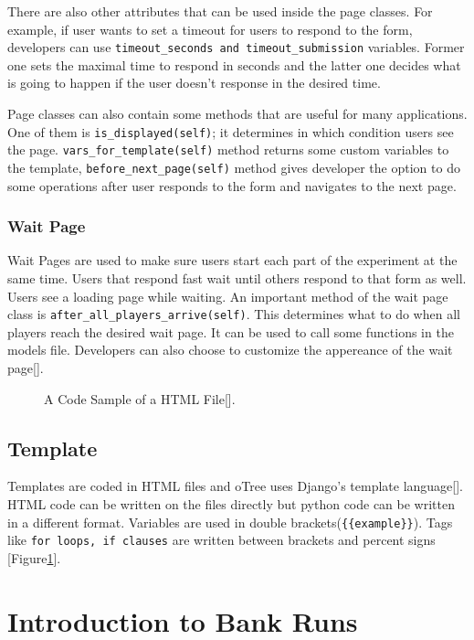 There are also other attributes that can be used inside the page classes. For example, if user wants to set a timeout for users to respond to the form, developers can use \verb|timeout_seconds and timeout_submission| variables. Former one sets the maximal time to respond in seconds and the latter one decides what is going to happen if the user doesn't response in the desired time.

Page classes can also contain some methods that are useful for many applications. One of them is \verb|is_displayed(self)|; it determines in which condition users see the page. \verb|vars_for_template(self)| method returns some custom variables to the template, \verb|before_next_page(self)| method gives developer the option to do some operations after user responds to the form and navigates to the next page.

\subsubsection{Wait Page}

Wait Pages are used to make sure users start each part of the experiment at the same time. Users that respond fast wait until others respond to that form as well. Users see a loading page while waiting. An important method of the wait page class is \verb|after_all_players_arrive(self)|. This determines what to do when all players reach the desired wait page. It can be used to call some functions in the models file. Developers can also choose to customize the appereance of the wait page[\cite{oTreeView2017}].

\begin{figure}[h]
	\centerline{}
	\caption{A Code Sample of a HTML File[\cite{DjangoTemplate2017}].}
	\label{fig:picture11}
\end{figure}

\subsection{Template}

Templates are coded in HTML files and oTree uses Django's template language[\cite{DjangoTemplate2017}]. HTML code can be written on the files directly but python code can be written in a different format. Variables are used in double brackets(\verb|{{example}}|). Tags like \verb|for loops, if clauses| are written between brackets and percent signs [Figure\ref{fig:picture11}]. 

\section{Introduction to Bank Runs}

